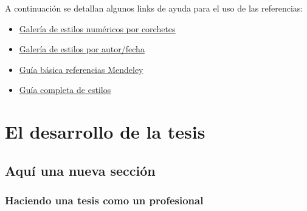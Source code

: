 A continuación se detallan algunos links de ayuda para el uso de las referencias:

\begin{itemize}
    \item \href{https://www.bibtex.com/bibliography-styles-numeric-square-brackets}{Galería de estilos numéricos por corchetes}
    \item \href{https://www.bibtex.com/bibliography-styles-author-date}{Galería de estilos por autor/fecha}
    \item \href{https://latex.ppizarror.com/res/guia_basica_referencias_mendeley_v3.pdf}{Guía básica referencias Mendeley}
    \item \href{https://latex.ppizarror.com/doc/bibstylescompared.pdf}{Guía completa de estilos}
\end{itemize}


\chapter{El desarrollo de la tesis}

\section{Aquí una nueva sección}

\subsection{Haciendo una tesis como un profesional}


	~ \lipsum[6] \newp

	~ \lipsum[115]


